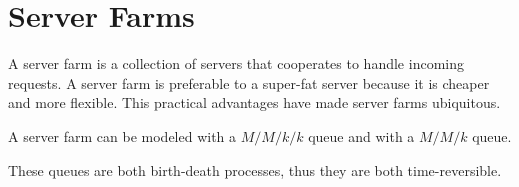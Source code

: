 \section{Server Farms}
\label{sec:server-farms}

A server farm is a collection of servers that cooperates to handle incoming requests. 
A server farm is preferable to a super-fat server because it is cheaper and more flexible. This practical advantages have made server farms ubiquitous.

A server farm can be modeled with a $M/M/k/k$ queue and with a $M/M/k$ queue.

These queues are both birth-death processes, thus they are both time-reversible.